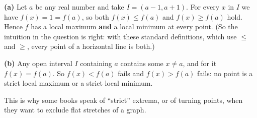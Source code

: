 \textbf{(a)} Let $a$ be any real number and take $I=(a-1,a+1)$. For every $x$ in $I$ we have $f(x)=1=f(a)$, so both $f(x)\le f(a)$ and $f(x)\ge f(a)$ hold. Hence $f$ has a local maximum \textbf{and} a local minimum at every point. (So the intuition in the question is right: with these standard definitions, which use $\le$ and $\ge$, every point of a horizontal line is both.)

\textbf{(b)} Any open interval $I$ containing $a$ contains some $x\ne a$, and for it $f(x)=f(a)$. So $f(x)<f(a)$ fails and $f(x)>f(a)$ fails: no point is a strict local maximum or a strict local minimum.

This is why some books speak of ``strict'' extrema, or of turning points, when they want to exclude flat stretches of a graph.
